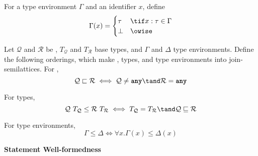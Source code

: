 \documentclass[10pt]{article}
\begin{document}
\begin{definition}
    For a type environment $\Gamma$ and an identifier $x$, define
    \[
        \Gamma(x) =
        \begin{cases}
            \tau & \tif x : \tau \in \Gamma \\
            \bot & \owise
        \end{cases}
    \]
\end{definition}

\begin{definition}
    Let $\mathcal{Q}$ and $\mathcal{R}$ be \typeQuantities, $T_\mathcal{Q}$ and $T_\mathcal{R}$ base types, and $\Gamma$ and $\Delta$ type environments.
    Define the following orderings, which make \typeQuantities, types, and type environments into join-semilattices.
    For \typeQuantities,
    \[
        \mathcal{Q} \sqsubset \mathcal{R} \iff \mathcal{Q} \neq \any \tand \mathcal{R} = \any
    \]

    For types,
    \[
        \mathcal{Q}~T_\mathcal{Q} \leq \mathcal{R}~T_\mathcal{R} \iff T_\mathcal{Q} = T_\mathcal{R} \tand \mathcal{Q} \sqsubseteq \mathcal{R}
    \]

    For type environments,
    \[
        \Gamma \leq \Delta \iff \forall x. \Gamma(x) \leq \Delta(x)
    \]
\end{definition}

 \textbf{Statement Well-formedness}
\begin{mathpar}




\end{mathpar}
\end{document}
